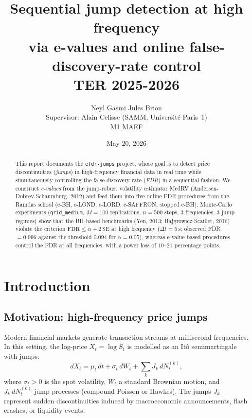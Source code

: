 \documentclass[11pt,a4paper]{article}
\title{%
  \textbf{Sequential jump detection at high frequency\\
  via e-values and online false-discovery-rate control}\\[0.5em]
  {\large TER 2025-2026}
}
\author{%
  Neyl Gasmi \quad\textbullet\quad Jules Brion\\[0.5em]
  {\small Supervisor: Alain Celisse (SAMM, Universit\'e Paris~1)}\\
  {\small M1 MAEF}
}
\date{May 20, 2026}
\theoremstyle{plain}
\theoremstyle{definition}
\theoremstyle{remark}
\newcommand{\dt}{\Delta}
\newcommand{\FDR}{\mathrm{FDR}}
\begin{document}
\maketitle

\begin{abstract}
This report documents the \texttt{efdr-jumps} project, whose goal is to detect
price discontinuities (\emph{jumps}) in high-frequency financial data in real
time while simultaneously controlling the false discovery rate (\emph{FDR})
in a sequential fashion.
We construct \emph{e-values} from the jump-robust volatility estimator MedRV
(Andersen-Dobrev-Schaumburg, 2012) and feed them into five online FDR
procedures from the Ramdas school (e-BH, e-LOND, e-LORD, e-SAFFRON, stopped
e-BH). Monte-Carlo experiments (\texttt{grid\_medium}, $M=100$ replications,
$n=500$ steps, $3$ frequencies, $3$ jump regimes) show that the BH-based
benchmarks (Yen, 2013; Bajgrowicz-Scaillet, 2016) violate the criterion
$\FDR \le \alpha + 2\,\mathrm{SE}$ at high frequency
($\dt t = 5\,\mathrm{s}$: observed FDR $=0.096$ against the threshold $0.094$ for
$\alpha=0.05$), whereas e-value-based procedures control the FDR at all
frequencies, with a power loss of $10$--$21$ percentage points.
\end{abstract}

\tableofcontents
\newpage

\section{Introduction}
\label{sec:intro}

\subsection{Motivation: high-frequency price jumps}

Modern financial markets generate transaction streams at millisecond
frequencies. In this setting, the log-price $X_t = \log S_t$ is modelled as an
It\^o semimartingale with jumps:
\begin{equation}\label{eq:sde}
  dX_t = \mu_t\,dt + \sigma_t\,dW_t + \sum_k J_k\,dN_t^{(k)},
\end{equation}
where $\sigma_t > 0$ is the spot volatility, $W_t$ a standard Brownian motion,
and $J_k\,dN_t^{(k)}$ jump processes (compound Poisson or Hawkes).
The jumps $J_k$ represent sudden discontinuities induced by macroeconomic
announcements, flash crashes, or liquidity events.
\end{document}
